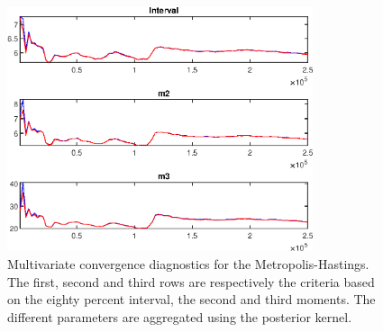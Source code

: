 
\begin{figure}[H]
\centering 
\includegraphics[width=0.8\textwidth]{two_sector_RBC_mobile/Output/two_sector_RBC_mobile_mdiag}
\caption{Multivariate convergence diagnostics for the Metropolis-Hastings.
The first, second and third rows are respectively the criteria based on
the eighty percent interval, the second and third moments. The different 
parameters are aggregated using the posterior kernel.}\label{Fig:MultivariateDiagnostics}
\end{figure}

